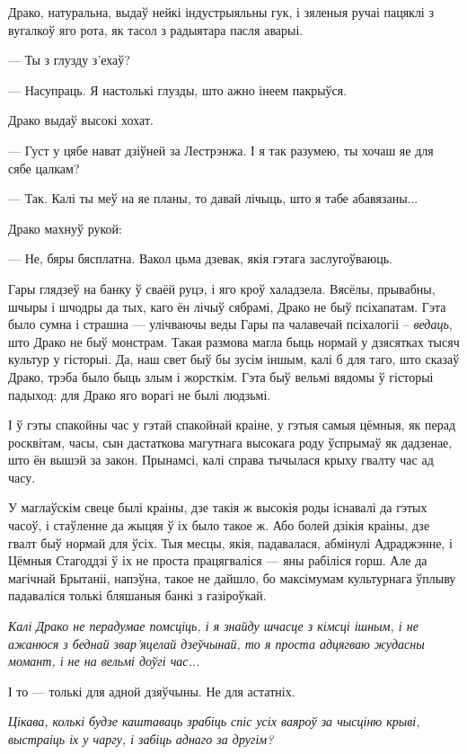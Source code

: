 Драко, натуральна, выдаў нейкі індустрыяльны гук, і зяленыя ручаі пацяклі з вугалкоў 
яго рота, як тасол з радыятара пасля аварыі.

--- Ты з глузду з'ехаў?

--- Насупраць. Я настолькі глузды, што ажно інеем пакрыўся.

Драко выдаў высокі хохат. 

--- Густ у цябе нават дзіўней за Лестрэнжа. І я так разумею, ты хочаш 
яе для сябе цалкам?

--- Так. Калі ты меў на яе планы,
то давай лічыць, што я табе абавязаны...

Драко махнуў рукой:

--- Не, бяры бясплатна. Вакол цьма дзевак, якія гэтага заслугоўваюць.

Гары глядзеў на банку ў сваёй руцэ, і яго кроў халадзела. Вясёлы, прывабны, 
шчыры і шчодры да тых, каго ён лічыў сябрамі, Драко не быў псіхапатам.
Гэта было сумна і страшна --- улічваючы веды Гары па чалавечай псіхалогіі -- 
\emph{ведаць}, што Драко не быў монстрам. Такая размова магла быць  нормай у 
дзясятках тысяч культур у гісторыі. Да, наш свет быў бы зусім іншым, калі б
для таго, што сказаў Драко, трэба было быць злым і жорсткім. Гэта быў вельмі 
вядомы ў гісторыі падыход: для Драко яго ворагі не былі людзьмі.

І ў гэты спакойны час у гэтай спакойнай краіне, у гэтыя самыя цёмныя, як перад
росквітам, часы, сын дастаткова магутнага высокага роду ўспрымаў як дадзенае,
што ён вышэй за закон. Прынамсі, калі справа тычылася крыху гвалту час ад часу.

У маглаўскім свеце былі краіны, дзе такія ж высокія роды існавалі да гэтых часоў,
і стаўленне да жыцяя ў іх было такое ж. Або болей дзікія краіны, дзе гвалт быў нормай
для ўсіх. Тыя месцы, якія, падавалася, абмінулі
Адраджэнне, і Цёмныя Стагоддзі ў іх не проста працягваліся --- яны рабіліся горш.
Але да магічнай Брытаніі, напэўна, такое не дайшло, бо максімумам культурнага 
ўплыву падаваліся толькі бляшаныя банкі з газіроўкай. 

\emph{Калі Драко не перадумае помсціць, і я знайду шчасце з кімсці ішным, і не ажанюся
з беднай звар'яцелай дзеўчынай, то я проста адцягваю жудасны момант, і не 
на вельмі доўгі час...}

І то --- толькі для адной дзяўчыны. Не для астатніх.

\emph{Цікава, колькі будзе каштаваць зрабіць спіс усіх ваяроў за чысціню крыві, 
выстраіць іх у чаргу, і забіць аднаго за другім?}


